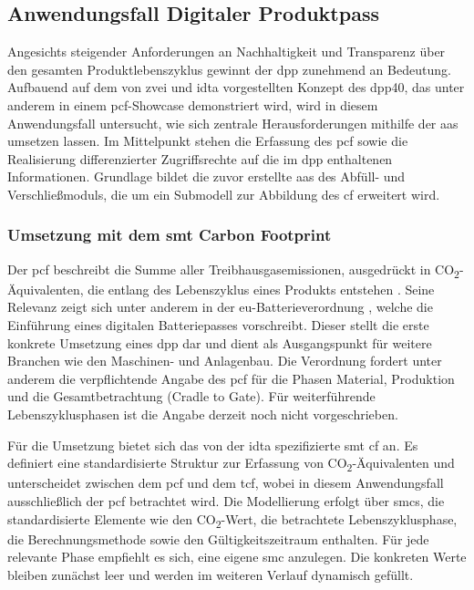 
\newpage
\subsection{Anwendungsfall Digitaler Produktpass}
Angesichts steigender Anforderungen an Nachhaltigkeit und Transparenz über den gesamten Produktlebenszyklus gewinnt der \acs{dpp} zunehmend an Bedeutung.
Aufbauend auf dem von \acs{zvei} und \acs{idta} vorgestellten Konzept des \acs{dpp40}, das unter anderem in einem \acs{pcf}-Showcase \cite{PCFShowcas} demonstriert wird, wird in diesem Anwendungsfall untersucht, wie sich zentrale Herausforderungen mithilfe der \acs{aas} umsetzen lassen.
Im Mittelpunkt stehen die Erfassung des \acs{pcf} sowie die Realisierung differenzierter Zugriffsrechte auf die im \acs{dpp} enthaltenen Informationen.
Grundlage bildet die zuvor erstellte \acs{aas} des Abfüll- und Verschließmoduls, die um ein Submodell zur Abbildung des \acs{cf} erweitert wird.

\subsubsection{Umsetzung mit dem \acs{smt} Carbon Footprint}
Der \acs{pcf} beschreibt die Summe aller Treibhausgasemissionen, ausgedrückt in CO\textsubscript{2}-Äqui\-valenten, die entlang des Lebenszyklus eines Produkts entstehen \cite{PCF}. 
Seine Relevanz zeigt sich unter anderem in der \acs{eu}-Batterieverordnung \cite{EUVerordnung}, welche die Einführung eines digitalen Batteriepasses vorschreibt. 
Dieser stellt die erste konkrete Umsetzung eines \acs{dpp} dar und dient als Ausgangspunkt für weitere Branchen wie den Maschinen- und Anlagenbau. 
Die Verordnung fordert unter anderem die verpflichtende Angabe des \acs{pcf} für die Phasen Material, Produktion und die Gesamtbetrachtung (Cradle to Gate). 
Für weiterführende Lebenszyklusphasen ist die Angabe derzeit noch nicht vorgeschrieben.

Für die Umsetzung bietet sich das von der \acs{idta} spezifizierte \acs{smt} \acs{cf} \cite{SpezifikaitonPCF} an.
Es definiert eine standardisierte Struktur zur Erfassung von CO\textsubscript{2}-Äquivalenten und unterscheidet zwischen dem \acs{pcf} und dem \ac{tcf}, wobei in diesem Anwendungsfall ausschließlich der \acs{pcf} betrachtet wird.
Die Modellierung erfolgt über \acsp{smc}, die standardisierte Elemente wie den CO\textsubscript{2}-Wert, die betrachtete Lebenszyklusphase, die Berechnungsmethode sowie den Gültigkeitszeitraum enthalten.
Für jede relevante Phase empfiehlt es sich, eine eigene \acs{smc} anzulegen.
Die konkreten Werte bleiben zunächst leer und werden im weiteren Verlauf dynamisch gefüllt.

